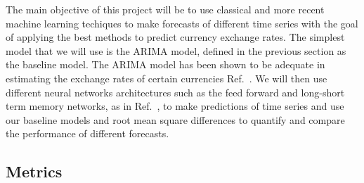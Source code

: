 \documentclass[10pt,a4paper]{article}
\begin{document}
The main objective of this project will be to use classical and more recent machine learning techiques to make forecasts of different time series with the goal of applying the best methods to predict currency exchange rates. The simplest model that we will use is the ARIMA model, defined in the previous section as the baseline model. The ARIMA model has been shown to be adequate in estimating the exchange rates of certain currencies Ref.~\cite{Mong_2016}. We will then use different neural networks architectures such as the feed forward and long-short term memory networks, as in Ref.~\cite{Chaudhuri_2016,Oancea_2014,Pant_2018}, to make predictions of time series and use our baseline models and root mean square differences to quantify and compare the performance of different forecasts.


\subsection{Metrics}
%
\end{document}
